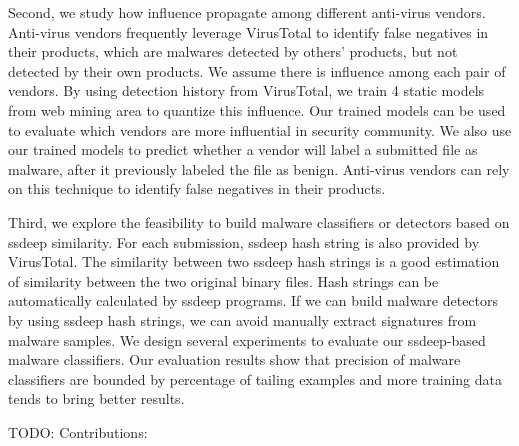 Second, we study how influence propagate among different anti-virus vendors. 
Anti-virus vendors frequently leverage VirusTotal to identify false negatives in their products, 
which are malwares detected by others’ products, 
but not detected by their own products. 
We assume there is influence among each pair of vendors. 
By using detection history from VirusTotal, 
we train 4 static models from web mining area to quantize this influence. 
Our trained models can be used to evaluate which vendors are more influential in security community. 
We also use our trained models to predict whether a vendor will label a submitted file as malware, 
after it previously labeled the file as benign. 
Anti-virus vendors can rely on this technique to identify false negatives in their products. 

Third, we explore the feasibility to build malware classifiers or detectors based on ssdeep similarity. 
For each submission, ssdeep hash string is also provided by VirusTotal. 
The similarity between two ssdeep hash strings 
is a good estimation of similarity between the two original binary files.
Hash strings can be automatically calculated by ssdeep programs. 
If we can build malware detectors by using ssdeep hash strings, 
we can avoid manually extract signatures from malware samples.   
We design several experiments to evaluate our ssdeep-based malware classifiers. 
Our evaluation results show that precision of malware classifiers are 
bounded by percentage of tailing examples and more training data tends to bring better results.

{\color{red} TODO: Contributions:}